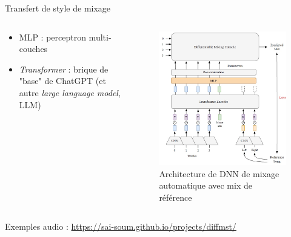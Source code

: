 \documentclass[9pt, aspectratio=169]{beamer}
\begin{document}
\begin{frame}{Transfert de style de mixage} %

\begin{columns}
    \begin{column}{0.48\textwidth}
		\begin{itemize}
			\item MLP : perceptron multi-couches
			\item \emph{Transformer} : brique de "base" de ChatGPT (et autre \emph{large language model}, LLM) \cite{vaswani_attention_2017}
		\end{itemize}
    \end{column}
    \begin{column}{0.48\textwidth}

\begin{figure}
	\includegraphics[width=.8\textwidth]{fig/diff_mst_2024.jpg}
	\caption{Architecture de DNN de mixage automatique avec mix de référence \cite{vanka_diff-mst_2024}}
\end{figure}

    \end{column}
\end{columns}
Exemples audio : \scriptsize \url{https://sai-soum.github.io/projects/diffmst/}

\end{frame}
\end{document}
